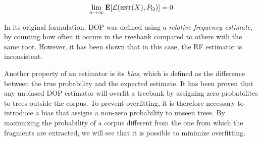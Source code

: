 $$\lim_{n \to \infty} \mathbf{E}[\mathcal{L}(\textsc{est}(X), P_\Omega)] = 0 $$


In its original formulation, DOP was defined using a \emph{relative frequency estimate}, by counting how often it occurs in the treebank compared to others with the same root. However, it has been shown \cite{johnson2002} that in this case, the RF estimator is inconsistent.

Another property of an estimator is its \emph{bias}, which is defined as the difference between the true probability and the expected estimate. 
It has been proven that any unbiased DOP estimator will overfit a treebank by assigning zero-probabilites to trees outside the corpus.
To prevent overfitting, it is therefore necessary to introduce a bias that assigns a non-zero probability to unseen trees.
By maximizing the probability of a corpus different from the one from which the fragments are extracted, we will see that it is possible to minimize overfitting.




